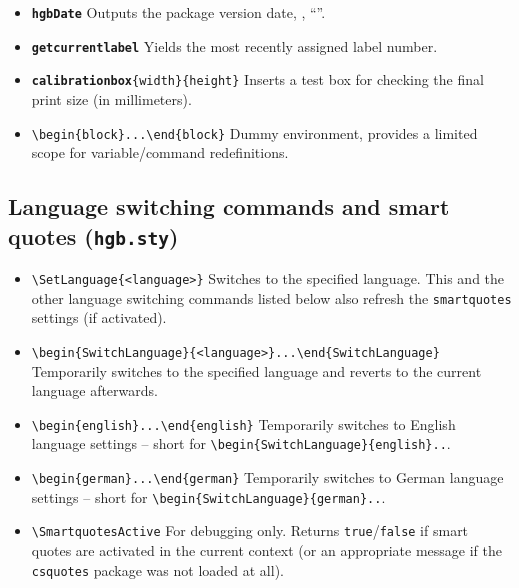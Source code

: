 \documentclass[english]{hgbarticle}
\begin{document}
\begin{itemize}
   \item \textbf{\texttt{{\bs}hgbDate}}\newline
    Outputs the package version date,
    \eg, ``\texttt{\hgbDate}''.
	\item \textbf{\texttt{{\bs}getcurrentlabel}}\newline
    Yields the most recently assigned label number.
   \item \textbf{\texttt{{\bs}calibrationbox}}\verb!{width}{height}!\newline
    Inserts a test box for checking the final print size (in millimeters).
	\item \verb!\begin{block}...\end{block}!\newline
    Dummy environment, provides a limited scope for variable/command redefinitions.
\end{itemize}


\subsection{Language switching commands and smart quotes (\texttt{hgb.sty})}
\label{sec:LanguageSwitchingCommands}

\begin{itemize}
	\item \verb!\SetLanguage{<language>}!\newline
    Switches to the specified language.
		This and the other language switching commands listed below
		also refresh the \texttt{smartquotes} settings (if activated).
	\item \verb!\begin{SwitchLanguage}{<language>}...\end{SwitchLanguage}!\newline
    Temporarily switches to the specified language and reverts to the current language 
		afterwards. 
	\item \verb!\begin{english}...\end{english}!\newline
    Temporarily switches to English language settings -- short for\newline
		\verb!\begin{SwitchLanguage}{english}..!.
	\item \verb!\begin{german}...\end{german}!\newline
    Temporarily switches to German language settings -- short for\newline
		\verb!\begin{SwitchLanguage}{german}..!.
	\item \verb!\SmartquotesActive!\newline
		For debugging only. Returns \texttt{true}/\texttt{false} if smart quotes are activated in
		the current context (or an appropriate message if the \texttt{csquotes} package was not loaded at all).
\end{itemize}
\end{document}
